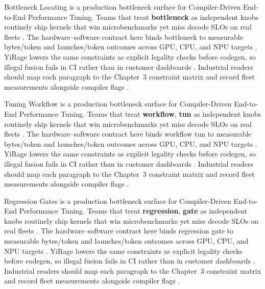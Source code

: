 Bottleneck Locating is a production bottleneck surface for Compiler-Driven End-to-End Performance Tuning. Teams that treat \textbf{bottleneck} as independent knobs routinely ship kernels that win microbenchmarks yet miss decode SLOs on real fleets \citep{amd2024xdna,dao2022flashattention}. The hardware--software contract here binds bottleneck to measurable bytes/token and launches/token outcomes across GPU, CPU, and NPU targets \citep{amd2024aie,kwon2023vllm}. YiRage lowers the same constraints as explicit legality checks before codegen, so illegal fusion fails in CI rather than in customer dashboards \citep{dlbook,nvidia2024cudagraphs}. Industrial readers should map each paragraph to the Chapter~3 constraint matrix and record fleet measurements alongside compiler flags \citep{dao2022flashattention,liu2024deepseekv3}.

Tuning Workflow is a production bottleneck surface for Compiler-Driven End-to-End Performance Tuning. Teams that treat \textbf{workflow}, \textbf{tun} as independent knobs routinely ship kernels that win microbenchmarks yet miss decode SLOs on real fleets \citep{amd2024aie,kwon2023vllm}. The hardware--software contract here binds workflow tun to measurable bytes/token and launches/token outcomes across GPU, CPU, and NPU targets \citep{dlbook,nvidia2024cudagraphs}. YiRage lowers the same constraints as explicit legality checks before codegen, so illegal fusion fails in CI rather than in customer dashboards \citep{dao2022flashattention,liu2024deepseekv3}. Industrial readers should map each paragraph to the Chapter~3 constraint matrix and record fleet measurements alongside compiler flags \citep{kwon2023vllm,patel2025llminference}.

Regression Gates is a production bottleneck surface for Compiler-Driven End-to-End Performance Tuning. Teams that treat \textbf{regression}, \textbf{gate} as independent knobs routinely ship kernels that win microbenchmarks yet miss decode SLOs on real fleets \citep{dlbook,nvidia2024cudagraphs}. The hardware--software contract here binds regression gate to measurable bytes/token and launches/token outcomes across GPU, CPU, and NPU targets \citep{dao2022flashattention,liu2024deepseekv3}. YiRage lowers the same constraints as explicit legality checks before codegen, so illegal fusion fails in CI rather than in customer dashboards \citep{kwon2023vllm,patel2025llminference}. Industrial readers should map each paragraph to the Chapter~3 constraint matrix and record fleet measurements alongside compiler flags \citep{nvidia2024cudagraphs,taxbreak2026}.

